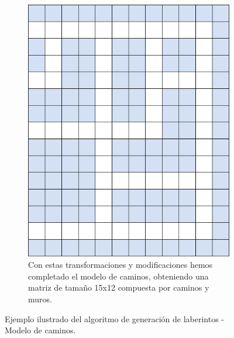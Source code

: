 \begin{figure}[H]
\begin{subfigure}[b]{0.45\textwidth}
            \includegraphics[scale=0.375]{img/paso12.png}
            \caption{Con estas transformaciones y modificaciones hemos completado el modelo de caminos, obteniendo una matriz de tamaño 15x12 compuesta por caminos y muros.}
        \end{subfigure}
        \caption{Ejemplo ilustrado del algoritmo de generación de laberintos - Modelo de caminos.}
        \label{fig:caminos}
    \end{figure}

